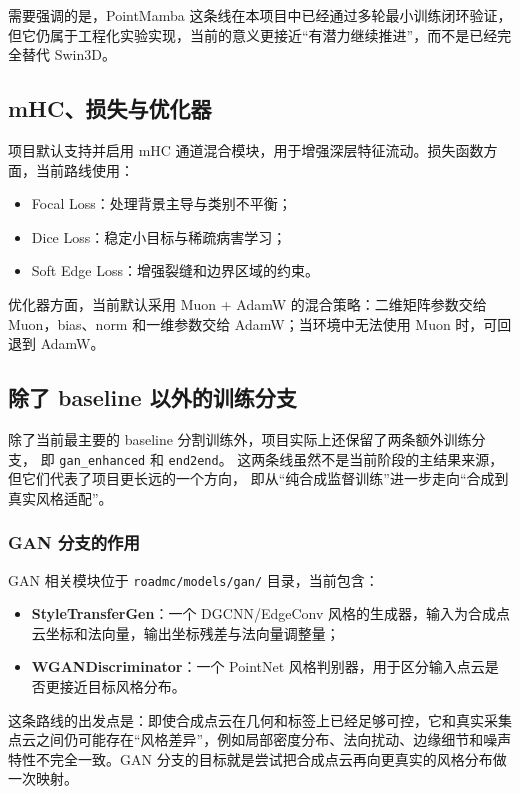 \documentclass[12pt]{ctexart}
\begin{document}
需要强调的是，PointMamba 这条线在本项目中已经通过多轮最小训练闭环验证，但它仍属于工程化实验实现，当前的意义更接近“有潜力继续推进”，而不是已经完全替代 Swin3D。

\subsection{mHC、损失与优化器}

项目默认支持并启用 mHC 通道混合模块，用于增强深层特征流动。损失函数方面，当前路线使用：

\begin{itemize}
  \item Focal Loss：处理背景主导与类别不平衡；
  \item Dice Loss：稳定小目标与稀疏病害学习；
  \item Soft Edge Loss：增强裂缝和边界区域的约束。
\end{itemize}

优化器方面，当前默认采用 Muon + AdamW 的混合策略：二维矩阵参数交给 Muon，bias、norm 和一维参数交给 AdamW；当环境中无法使用 Muon 时，可回退到 AdamW。

\subsection{除了 baseline 以外的训练分支}

除了当前最主要的 baseline 分割训练外，项目实际上还保留了两条额外训练分支，
即 \texttt{gan\_enhanced} 和 \texttt{end2end}。
这两条线虽然不是当前阶段的主结果来源，但它们代表了项目更长远的一个方向，
即从“纯合成监督训练”进一步走向“合成到真实风格适配”。

\subsubsection{GAN 分支的作用}

GAN 相关模块位于 \texttt{roadmc/models/gan/} 目录，当前包含：

\begin{itemize}
  \item \textbf{StyleTransferGen}：一个 DGCNN/EdgeConv 风格的生成器，输入为合成点云坐标和法向量，输出坐标残差与法向量调整量；
  \item \textbf{WGANDiscriminator}：一个 PointNet 风格判别器，用于区分输入点云是否更接近目标风格分布。
\end{itemize}

这条路线的出发点是：即使合成点云在几何和标签上已经足够可控，它和真实采集点云之间仍可能存在“风格差异”，例如局部密度分布、法向扰动、边缘细节和噪声特性不完全一致。GAN 分支的目标就是尝试把合成点云再向更真实的风格分布做一次映射。
\end{document}

